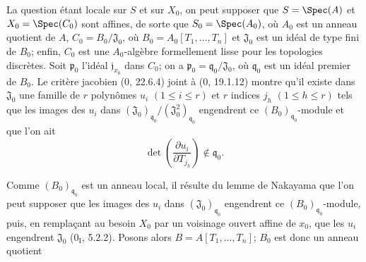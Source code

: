 La question étant locale sur $S$ et sur $X_0$, on peut supposer que $S=\Spec(A)$ et $X_0=\Spec(C_0)$ sont affines, de sorte que $S_0=\Spec(A_0)$, où $A_0$ est un anneau quotient de $A$, $C_0=B_0/\mathfrak J_0$, où $B_0=A_0[T_1,\ldots,T_n]$ et $\mathfrak J_0$ est un idéal de type fini de $B_0$; enfin, $C_0$ est une $A_0$-algèbre formellement lisse pour les topologies discrètes. Soit $\mathfrak p_0$ l'idéal $\mathfrak j_{x_0}$ dans $C_0$; on a $\mathfrak p_0=\mathfrak q_0/\mathfrak J_0$, où $\mathfrak q_0$ est un idéal premier de $B_0$. Le critère jacobien (0, 22.6.4) joint à (0, 19.1.12) montre qu'il existe dans $\mathfrak J_0$ une famille de $r$ polynômes $u_i$ $(1\leq i\leq r)$ et $r$ indices $j_h$ $(1\leq h\leq r)$ tels que les images des $u_i$ dans $(\mathfrak J_0)_{\mathfrak q_0}/(\mathfrak J_0^2)_{\mathfrak q_0}$ engendrent ce $(B_0)_{\mathfrak q_0}$-module et que l'on ait
\begin{equation}
  \det\left(\frac{\partial u_i}{\partial T_{j_h}}\right)\notin\mathfrak q_0.
  \tag{18.1.1.1}\label{IV.18.1.1.1}
\end{equation}

Comme $(B_0)_{\mathfrak q_0}$ est un anneau local, il résulte du lemme de Nakayama que l'on peut supposer que les images des $u_i$ dans $(\mathfrak J_0)_{\mathfrak q_0}$ engendrent ce $(B_0)_{\mathfrak q_0}$-module, puis, en remplaçant au besoin $X_0$ par un voisinage ouvert affine de $x_0$, que les $u_i$ engendrent $\mathfrak J_0$ ($0_{\mathrm I}$, 5.2.2). Posons alors $B=A[T_1,\ldots,T_n]$; $B_0$ est donc un anneau quotient

